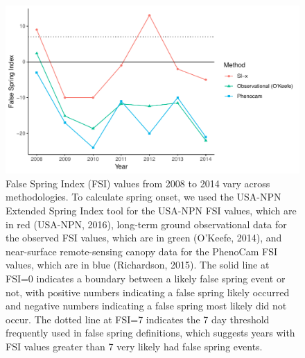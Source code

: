 \documentclass{article}\usepackage[]{graphicx}\usepackage[]{color}
\makeatletter
\def\maxwidth{ %
  \ifdim\Gin@nat@width>\linewidth
    \linewidth
  \else
    \Gin@nat@width
  \fi
}
\makeatother
\begin{document}
\begin{figure}[H]

{\centering \includegraphics[width=\maxwidth]{figure/fsifig-1} 

}

\caption[False Spring Index (FSI) values from 2008 to 2014 vary across methodologies]{False Spring Index (FSI) values from 2008 to 2014 vary across methodologies. To calculate spring onset, we used the USA-NPN Extended Spring Index tool for the USA-NPN FSI values, which are in red (USA-NPN, 2016), long-term ground observational data for the observed FSI values, which are in green (O'Keefe, 2014), and near-surface remote-sensing canopy data for the PhenoCam FSI values, which are in blue (Richardson, 2015). The solid line at FSI=0 indicates a boundary between a likely false spring event or not, with positive numbers indicating a false spring likely occurred and negative numbers indicating a false spring most likely did not occur. The dotted line at FSI=7 indicates the 7 day threshold frequently used in false spring definitions, which suggests years with FSI values greater than 7 very likely had false spring events.}\label{fig:fsifig}
\end{figure}
\end{document}
